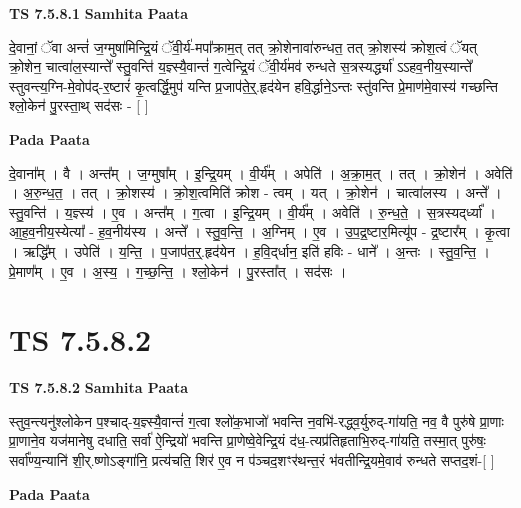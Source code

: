 \documentclass[17pt]{extarticle}
\begin{document}
\textbf{TS 7.5.8.1 } \newline
\textbf{Samhita Paata} \newline

दे॒वानां॒ ॅवा अन्तं॑ ज॒ग्मुषा॑मिन्द्रि॒यं ॅवी॒र्य॑-मपा᳚क्राम॒त् तत् क्रो॒शेनावा॑रुन्धत॒ तत् क्रो॒शस्य॑ क्रोश॒त्वं ॅयत् क्रो॒शेन॒ चात्वा॑ल॒स्यान्ते᳚ स्तु॒वन्ति॑ य॒ज्ञ्स्यै॒वान्तं॑ ग॒त्वेन्द्रि॒यं ॅवी॒र्य॑मव॑ रुन्धते स॒त्रस्यर्द्ध्या॑ ऽऽहव॒नीय॒स्यान्ते᳚ स्तुवन्त्य॒ग्नि-मे॒वोप॑द्-र॒ष्टारं॑ कृ॒त्वर्द्धि॒मुप॑ यन्ति प्र॒जाप॑ते॒र्॒.हृद॑येन हवि॒र्द्धाने॒ऽन्तः स्तु॑वन्ति प्रे॒माण॑मे॒वास्य॑ गच्छन्ति श्लो॒केन॑ पु॒रस्ता॒थ् सद॑सः - [  ] \newline

\textbf{Pada Paata} \newline

दे॒वाना᳚म् । वै । अन्त᳚म् । ज॒ग्मुषा᳚म् । इ॒न्द्रि॒यम् । वी॒र्य᳚म् । अपेति॑ । अ॒क्रा॒म॒त् । तत् । क्रो॒शेन॑ । अवेति॑ । अ॒रु॒न्ध॒त॒ । तत् । क्रो॒शस्य॑ । क्रो॒श॒त्वमिति॑ क्रोश - त्वम् । यत् । क्रो॒शेन॑ । चात्वा॑लस्य । अन्ते᳚ । स्तु॒वन्ति॑ । य॒ज्ञ्स्य॑ । ए॒व । अन्त᳚म् । ग॒त्वा । इ॒न्द्रि॒यम् । वी॒र्य᳚म् । अवेति॑ । रु॒न्ध॒ते॒ । स॒त्रस्यद्‌र्ध्या᳚ । आ॒ह॒व॒नीय॒स्येत्या᳚ - ह॒व॒नीय॑स्य । अन्ते᳚ । स्तु॒व॒न्ति॒ । अ॒ग्निम् । ए॒व । उ॒प॒द्र॒ष्टार॒मित्यू॑प - द्र॒ष्टार᳚म् । कृ॒त्वा । ऋद्धि᳚म् । उपेति॑ । य॒न्ति॒ । प॒जाप॑त॒र्॒.हृद॑येन । ह॒वि॒द्‌र्धान॒ इति॑ हविः - धाने᳚ । अ॒न्तः । स्तु॒व॒न्ति॒ । प्रे॒माण᳚म् । ए॒व । अ॒स्य॒ । ग॒च्छ॒न्ति॒ । श्लो॒केन॑ । पु॒रस्ता᳚त् । सद॑सः ।  \newline





\section{ TS 7.5.8.2 }

\textbf{TS 7.5.8.2 } \newline
\textbf{Samhita Paata} \newline

स्तुव॒न्त्यनु॑श्लोकेन प॒श्चाद्-य॒ज्ञ्स्यै॒वान्तं॑ ग॒त्वा श्लो॑क॒भाजो॑ भवन्ति न॒वभि॑-रद्ध्व॒र्युरुद्-गा॑यति॒ नव॒ वै पुरु॑षे प्रा॒णाः प्रा॒णाने॒व यज॑मानेषु दधाति॒ सर्वा॑ ऐ॒न्द्रियो॑ भवन्ति प्रा॒णेष्वे॒वेन्द्रि॒यं द॑ध॒-त्यप्र॑तिहृताभि॒रुद्-गा॑यति॒ तस्मा॒त् पुरु॑षः॒ सर्वा᳚ण्य॒न्यानि॑ शी॒र्.ष्णोऽङ्गा॑नि॒ प्रत्य॑चति॒ शिर॑ ए॒व न प॑ञ्चद॒शꣳर॑थन्त॒रं भ॑वतीन्द्रि॒यमे॒वाव॑ रुन्धते सप्तद॒शं-[  ] \newline

\textbf{Pada Paata} \newline
\end{document}
